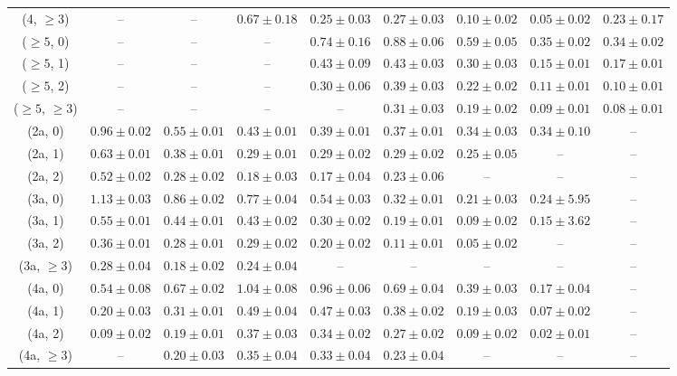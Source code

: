 \begin{table}[h!]
{\begin{tabular}{ccccccccc}
	(4, $\ge3$) & -- & -- & $0.67\pm 0.18$ & $0.25\pm 0.03$ & $0.27\pm 0.03$ & $0.10\pm 0.02$ & $0.05\pm 0.02$ & $0.23\pm 0.17$ \\[0.5ex] 
	($\ge5$, 0) & -- & -- & -- & $0.74\pm 0.16$ & $0.88\pm 0.06$ & $0.59\pm 0.05$ & $0.35\pm 0.02$ & $0.34\pm 0.02$ \\[0.5ex] 
	($\ge5$, 1) & -- & -- & -- & $0.43\pm 0.09$ & $0.43\pm 0.03$ & $0.30\pm 0.03$ & $0.15\pm 0.01$ & $0.17\pm 0.01$ \\[0.5ex] 
	($\ge5$, 2) & -- & -- & -- & $0.30\pm 0.06$ & $0.39\pm 0.03$ & $0.22\pm 0.02$ & $0.11\pm 0.01$ & $0.10\pm 0.01$ \\[0.5ex] 
	($\ge5$, $\ge3$) & -- & -- & -- & -- & $0.31\pm 0.03$ & $0.19\pm 0.02$ & $0.09\pm 0.01$ & $0.08\pm 0.01$ \\[0.5ex] 
	(2a, 0) & $0.96\pm 0.02$ & $0.55\pm 0.01$ & $0.43\pm 0.01$ & $0.39\pm 0.01$ & $0.37\pm 0.01$ & $0.34\pm 0.03$ & $0.34\pm 0.10$ & -- \\[0.5ex] 
	(2a, 1) & $0.63\pm 0.01$ & $0.38\pm 0.01$ & $0.29\pm 0.01$ & $0.29\pm 0.02$ & $0.29\pm 0.02$ & $0.25\pm 0.05$ & -- & -- \\[0.5ex] 
	(2a, 2) & $0.52\pm 0.02$ & $0.28\pm 0.02$ & $0.18\pm 0.03$ & $0.17\pm 0.04$ & $0.23\pm 0.06$ & -- & -- & -- \\[0.5ex] 
	(3a, 0) & $1.13\pm 0.03$ & $0.86\pm 0.02$ & $0.77\pm 0.04$ & $0.54\pm 0.03$ & $0.32\pm 0.01$ & $0.21\pm 0.03$ & $0.24\pm 5.95$ & -- \\[0.5ex] 
	(3a, 1) & $0.55\pm 0.01$ & $0.44\pm 0.01$ & $0.43\pm 0.02$ & $0.30\pm 0.02$ & $0.19\pm 0.01$ & $0.09\pm 0.02$ & $0.15\pm 3.62$ & -- \\[0.5ex] 
	(3a, 2) & $0.36\pm 0.01$ & $0.28\pm 0.01$ & $0.29\pm 0.02$ & $0.20\pm 0.02$ & $0.11\pm 0.01$ & $0.05\pm 0.02$ & -- & -- \\[0.5ex] 
	(3a, $\ge3$) & $0.28\pm 0.04$ & $0.18\pm 0.02$ & $0.24\pm 0.04$ & -- & -- & -- & -- & -- \\[0.5ex] 
	(4a, 0) & $0.54\pm 0.08$ & $0.67\pm 0.02$ & $1.04\pm 0.08$ & $0.96\pm 0.06$ & $0.69\pm 0.04$ & $0.39\pm 0.03$ & $0.17\pm 0.04$ & -- \\[0.5ex] 
	(4a, 1) & $0.20\pm 0.03$ & $0.31\pm 0.01$ & $0.49\pm 0.04$ & $0.47\pm 0.03$ & $0.38\pm 0.02$ & $0.19\pm 0.03$ & $0.07\pm 0.02$ & -- \\[0.5ex] 
	(4a, 2) & $0.09\pm 0.02$ & $0.19\pm 0.01$ & $0.37\pm 0.03$ & $0.34\pm 0.02$ & $0.27\pm 0.02$ & $0.09\pm 0.02$ & $0.02\pm 0.01$ & -- \\[0.5ex] 
	(4a, $\ge3$) & -- & $0.20\pm 0.03$ & $0.35\pm 0.04$ & $0.33\pm 0.04$ & $0.23\pm 0.04$ & -- & -- & -- \\[0.5ex] 

\end{tabular}}
\end{table}
